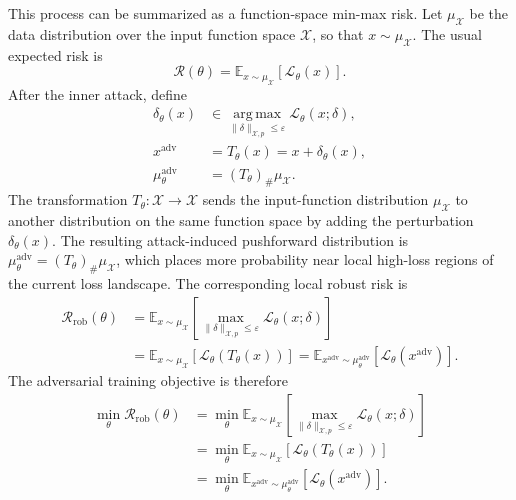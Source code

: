 \documentclass[letterpaper]{article} %
\begin{document}
This process can be summarized as a function-space min-max risk.  Let
$\mu_{\mathcal X}$ be the data distribution over the input function space
$\mathcal X$, so that $x\sim\mu_{\mathcal X}$.  The usual expected risk is
\begin{equation*}
  \mathcal R(\theta)
  =
  \mathbb E_{x\sim\mu_{\mathcal X}}
  \left[
    \mathcal L_\theta(x)
  \right].
\end{equation*}
After the inner attack, define
\begin{align*}
  \delta_\theta(x)
  &\in
  \operatorname*{arg\,max}_{\|\delta\|_{\mathcal X,p}\le\varepsilon}
  \mathcal L_\theta(x;\delta),\\
  x^{\mathrm{adv}}
  &=T_\theta(x)=x+\delta_\theta(x),\\
  \mu_\theta^{\mathrm{adv}}
  &=(T_\theta)_\#\mu_{\mathcal X}.
\end{align*}
The transformation \(T_\theta:\mathcal X\to\mathcal X\) sends the input-function
distribution \(\mu_{\mathcal X}\) to another distribution on the same function
space by adding the perturbation \(\delta_\theta(x)\).  The resulting
attack-induced pushforward distribution is
\(\mu_\theta^{\mathrm{adv}}=(T_\theta)_\#\mu_{\mathcal X}\), which places more
probability near local high-loss regions of the current loss landscape.  The
corresponding local robust risk is
\begin{align*}
  \mathcal R_{\mathrm{rob}}(\theta)
  &=
  \mathbb E_{x\sim\mu_{\mathcal X}}
  \left[
    \max_{\|\delta\|_{\mathcal X,p}\le \varepsilon}
    \mathcal L_\theta(x;\delta)
  \right]\\
  &=
  \mathbb E_{x\sim\mu_{\mathcal X}}
  \left[
    \mathcal L_\theta(T_\theta(x))
  \right]
  =
  \mathbb E_{x^{\mathrm{adv}}\sim\mu_\theta^{\mathrm{adv}}}
  \left[
    \mathcal L_\theta(x^{\mathrm{adv}})
  \right].
\end{align*}
The adversarial training objective is therefore
\begin{align*}
  \min_\theta \mathcal R_{\mathrm{rob}}(\theta)
  &=
  \min_\theta
  \mathbb E_{x\sim\mu_{\mathcal X}}
  \left[
    \max_{\|\delta\|_{\mathcal X,p}\le \varepsilon}
    \mathcal L_\theta(x;\delta)
  \right]\\
  &=
  \min_\theta
  \mathbb E_{x\sim\mu_{\mathcal X}}
  \left[
    \mathcal L_\theta(T_\theta(x))
  \right]\\
  &=
  \min_\theta
  \mathbb E_{x^{\mathrm{adv}}\sim\mu_\theta^{\mathrm{adv}}}
  \left[
    \mathcal L_\theta(x^{\mathrm{adv}})
  \right].
\end{align*}
\end{document}
